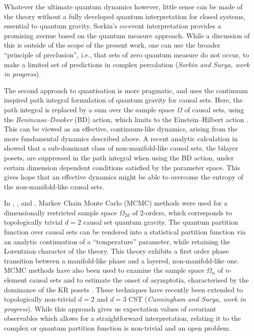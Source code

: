Whatever the ultimate quantum dynamics  however, little sense can be
made of the theory without a fully developed quantum interpretation for closed systems, essential to quantum gravity. Sorkin's co-event interpretation
\citep{sorkinalogic,kochenspecker} provides a promising avenue based on the quantum measure approach. While a discussion
of this is outside of the scope of the present work, one can use the broader ``principle of preclusion'', i.e., that sets of zero quantum measure do not
occur\citep{sorkinalogic,kochenspecker}, to make a limited set of  predictions in complex percolation ({\it Sorkin and Surya, work in progress}).  



The second approach to quantisation is more pragmatic, and uses the continuum inspired path integral formulation of
quantum gravity for causal sets. 
Here, the path integral is replaced by a sum over the sample space $\Omega$ of causal sets, using the \emph{Benincasa--Dowker} (BD) action, which limits to  the  Einstein--Hilbert action \citep{bd}. This can be viewed as an
effective, continuum-like dynamics, arising from the more fundamental dynamics described above. A recent
analytic calculation in \cite{carliploomis} showed that a sub-dominant 
class of non-manifold-like causal sets, the bilayer posets, are suppressed in the path integral when using the BD
action, under certain dimension dependent conditions satisfied by the parameter space. This gives hope that an 
effective dynamics might be able to overcome the entropy of the non-manifold-like causal sets. 

 
In \cite{2dqg}, \cite{2dhh}, and \cite{fss}, Markov Chain Monte Carlo (MCMC) methods were used for a dimensionally restricted sample space
$\Omega_{2d}$ of 2-orders, which corresponds to topologically trivial $d=2$ causal set quantum gravity. 
The quantum partition function over causal sets can be rendered into a statistical partition function via an analytic
continuation of a  ``temperature'' parameter, while retaining  the Lorentzian character of the theory. This theory
exhibits a first order phase transition \citep{2dqg,fss} between a manifold-like phase and a layered, non-manifold-like
one. MCMC methods have also been used to examine the sample space $\Omega_n$ of $n$-element causal sets and to estimate the
onset of asymptotia, characterised by 
the dominance of the KR posets \citep{onset}. These techniques have recently  been extended to topologically non-trivial
$d=2$ and $d=3$ CST ({\it Cunningham and Surya, work in progress}). While this approach gives us expectation values of covariant observables
which allows for a straightforward interpretation, relating it to the complex or quantum partition function is
non-trivial and an open problem. 

